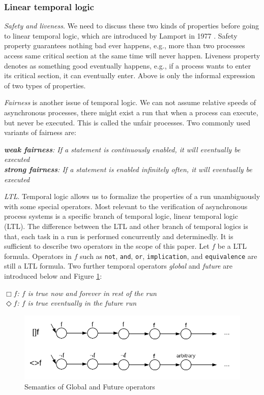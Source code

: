\subsubsection{Linear temporal logic}
\textit{Safety and liveness}. We need to discuss these two kinds of properties before going to linear temporal logic, which are introduced by Lamport in 1977 \cite{Lamport:1977:PCM:1313313.1313439}. Safety property guarantees nothing bad ever happens, e.g., more than two processes access same critical section at the same time will never happen. Liveness property denotes as something good eventually happens, e.g., if a process wants to enter its critical section, it can eventually enter. Above is only the informal expression of two types of properties.

\textit{Fairness} is another issue of temporal logic. We can not assume relative speeds of asynchronous processes, there might exist a run that when a process can execute, but never be executed. This is called the unfair processes. Two commonly used variants of fairness are:

{\medbreak\indent\textit{\textbf{weak fairness}: If a statement is continuously enabled, it will eventually be executed}}
{\\\indent\textit{\textbf{strong fairness}: If a statement is enabled infinitely often, it will eventually be executed}}
\medbreak

\textit{LTL}. Temporal logic allows us to formalize the properties of a run unambiguously with some special operators. Most relevant to the verification of asynchronous process systems is a specific branch of temporal logic, linear temporal logic (LTL). The difference between the LTL and other branch of temporal logics is that, each task in a run is performed concurrently and determinedly. It is sufficient to describe two operators in the scope of this paper. Let $f$ be a LTL formula. Operators in $f$ such as \texttt{not}, \texttt{and}, \texttt{or}, \texttt{implication}, and \texttt{equivalence} are still a LTL formula. Two further temporal operators \textit{global} and \textit{future} are introduced below and Figure \ref{fig:ltl}:

{\medbreak\indent\textit{$\Box f$: $f$ is true now and forever in rest of the run}}
{\\\indent\textit{$\Diamond f$: $f$ is true eventually in the future run}}
\medbreak

\begin{figure}
\includegraphics[width=0.9\linewidth]{img/ltl}
\caption{Semantics of Global and Future operators}
\label{fig:ltl}
\end{figure}

